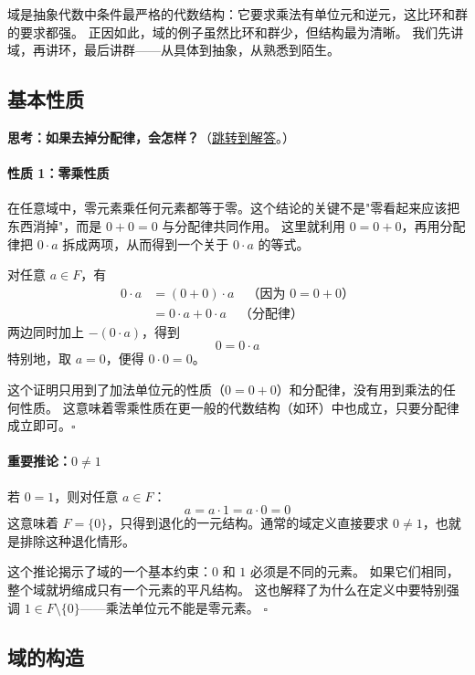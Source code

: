 域是抽象代数中条件最严格的代数结构：它要求乘法有单位元和逆元，这比环和群的要求都强。
正因如此，域的例子虽然比环和群少，但结构最为清晰。
我们先讲域，再讲环，最后讲群——从具体到抽象，从熟悉到陌生。

\subsection{基本性质}

\hypertarget{q:no-distributive-law}{}
\medskip
\noindent\textbf{思考：如果去掉分配律，会怎样？}（\hyperlink{ans:no-distributive-law}{跳转到解答}。）
\medskip

\paragraph*{性质 1：零乘性质}
在任意域中，零元素乘任何元素都等于零。这个结论的关键不是"零看起来应该把东西消掉"，而是 $0+0=0$ 与分配律共同作用。
这里就利用 $0 = 0 + 0$，再用分配律把 $0 \cdot a$ 拆成两项，从而得到一个关于 $0 \cdot a$ 的等式。

对任意 $a \in F$，有
\begin{align*}
0 \cdot a &= (0 + 0) \cdot a \quad \text{（因为 $0 = 0 + 0$）} \\
          &= 0 \cdot a + 0 \cdot a \quad \text{（分配律）}
\end{align*}
两边同时加上 $-(0 \cdot a)$，得到
\[0 = 0 \cdot a\]
特别地，取 $a = 0$，便得 $0 \cdot 0 = 0$。

这个证明只用到了加法单位元的性质（$0 = 0 + 0$）和分配律，没有用到乘法的任何性质。
这意味着零乘性质在更一般的代数结构（如环）中也成立，只要分配律成立即可。$\square$

\paragraph*{重要推论：$0 \neq 1$}
若 $0 = 1$，则对任意 $a \in F$：
\[a = a \cdot 1 = a \cdot 0 = 0\]
这意味着 $F = \{0\}$，只得到退化的一元结构。通常的域定义直接要求 $0 \neq 1$，也就是排除这种退化情形。

这个推论揭示了域的一个基本约束：$0$ 和 $1$ 必须是不同的元素。
如果它们相同，整个域就坍缩成只有一个元素的平凡结构。
这也解释了为什么在定义中要特别强调 $1 \in F \setminus \{0\}$——乘法单位元不能是零元素。 $\square$

\subsection{域的构造}

